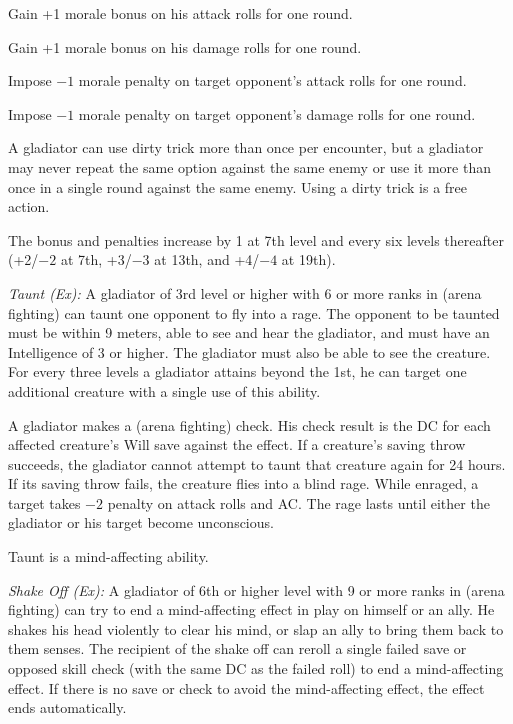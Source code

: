 \begin{itemize*}
\item Gain +1 morale bonus on his attack rolls for one round.
\item Gain +1 morale bonus on his damage rolls for one round.
\item Impose $-1$ morale penalty on target opponent's attack rolls for one round.
\item Impose $-1$ morale penalty on target opponent's damage rolls for one round.
\end{itemize*}

A gladiator can use dirty trick more than once per encounter, but a gladiator may never repeat the same option against the same enemy or use it more than once in a single round against the same enemy. Using a dirty trick is a free action.

The bonus and penalties increase by 1 at 7th level and every six levels thereafter (+2/$-2$ at 7th, +3/$-3$ at 13th, and +4/$-4$ at 19th).

\textit{Taunt (Ex):} A gladiator of 3rd level or higher with 6 or more ranks in  (arena fighting) can taunt one opponent to fly into a rage. The opponent to be taunted must be within 9 meters, able to see and hear the gladiator, and must have an Intelligence of 3 or higher. The gladiator must also be able to see the creature. For every three levels a gladiator attains beyond the 1st, he can target one additional creature with a single use of this ability.

A gladiator makes a  (arena fighting) check. His check result is the DC for each affected creature's Will save against the effect. If a creature's saving throw succeeds, the gladiator cannot attempt to taunt that creature again for 24 hours. If its saving throw fails, the creature flies into a blind rage. While enraged, a target takes $-2$ penalty on attack rolls and AC. The rage lasts until either the gladiator or his target become unconscious.

Taunt is a mind-affecting ability.

\textit{Shake Off (Ex):} A gladiator of 6th or higher level with 9 or more ranks in  (arena fighting) can try to end a mind-affecting effect in play on himself or an ally. He shakes his head violently to clear his mind, or slap an ally to bring them back to them senses. The recipient of the shake off can reroll a single failed save or opposed skill check (with the same DC as the failed roll) to end a mind-affecting effect. If there is no save or check to avoid the mind-affecting effect, the effect ends automatically.

